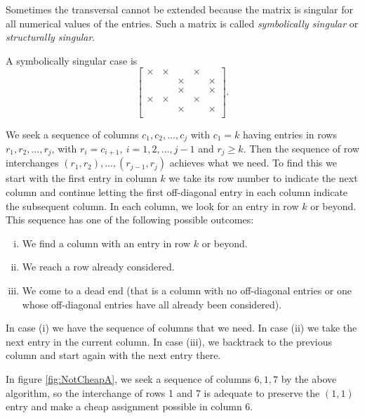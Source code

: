 \begin{defn}
  Sometimes the transversal cannot be extended because the matrix is
  singular for all numerical values of the entries. Such a matrix is
  called \emph{symbolically singular} or \emph{structurally singular}.
\end{defn}

\begin{exm}
  A symbolically singular case is
  $$\left[
    \begin{array}{ccccc}
      \times & \times & & \times & \\
             & & \times & & \times\\
      & & \times & & \times\\
      \times & \times & & \times & \\
      & & \times & & \times\\
    \end{array}
  \right].$$
\end{exm}

\begin{alg}
  \label{algo:DFSforTransversal}
  We seek a sequence of columns $c_1,c_2,\ldots,c_j$ with
  $c_1=k$ having entries in rows $r_1,r_2,\ldots,r_j$, with
  $r_i=c_{i+1},\ i=1,2,\ldots,j-1$ and $r_j\geq k.$ Then the sequence of
  row interchanges $(r_1,r_2),\ldots,(r_{j-1},r_j)$ achieves what we
  need. To find this we start with the first entry in column $k$ we take
  its row number to indicate the next column and continue letting the
  first off-diagonal entry in each column indicate the subsequent
  column. In each column, we look for an entry in row $k$ or
  beyond. This sequence has one of the following possible outcomes:
  \begin{enumerate}[(i)]
  \item We find a column with an entry in row $k$ or beyond.
  \item We reach a row already considered.
  \item We come to a dead end (that is a column with no off-diagonal
    entries or one whose off-diagonal entries have all already been considered).
  \end{enumerate}
  In case (i) we have the sequence of columns that we need. In case
  (ii) we take the next entry in the current column. In case (iii), we
  backtrack to the previous column and start again with the next entry there.
\end{alg}

\begin{exm}
  In figure \ref{fig:NotCheapA}, we seek a sequence of
  columns $6,1,7$ by the above algorithm, so the interchange of rows 1
  and 7 is adequate to preserve the $(1,1)$ entry and make a cheap
  assignment possible in column 6. 
\end{exm}

